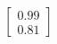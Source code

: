 \documentclass[preview]{standalone}
\begin{document}
\begin{align*}
\begin{bmatrix} 0.99 \\ 0.81 \end{bmatrix}
\end{align*}
\end{document}
